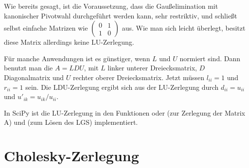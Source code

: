 Wie bereits gesagt, ist die Voraussetzung, dass die Gaußelimination
mit kanonischer Pivotwahl durchgeführt werden kann, sehr restriktiv, und
schließt selbst einfache Matrizen wie {\tiny $\begin{pmatrix} 0 & 1\\
    1 & 0\end{pmatrix}$} aus. Wie man sich leicht überlegt, besitzt
diese Matrix allerdings keine LU-Zerlegung.

Für manche Anwendungen ist es günstiger, wenn $L$ und $U$ normiert
sind. Dann benutzt man die  $A=LDU$, mit $L$
linker unterer Dreiecksmatrix, $D$ Diagonalmatrix und $U$ rechter
oberer Dreiecksmatrix. Jetzt müssen $l_{ii}=1$ und $r_{ii}=1$
sein. Die LDU-Zerlegung ergibt sich aus der LU-Zerlegung durch $d_{ii}
= u_{ii}$ und $u'_{ik}=u_{ik}/u_{ii}$.

In SciPy ist die LU-Zerlegung in den Funktionen
 oder  (zur
Zerlegung der Matrix A) und 
(zum Lösen des LGS) implementiert.

\section{Cholesky-Zerlegung}

